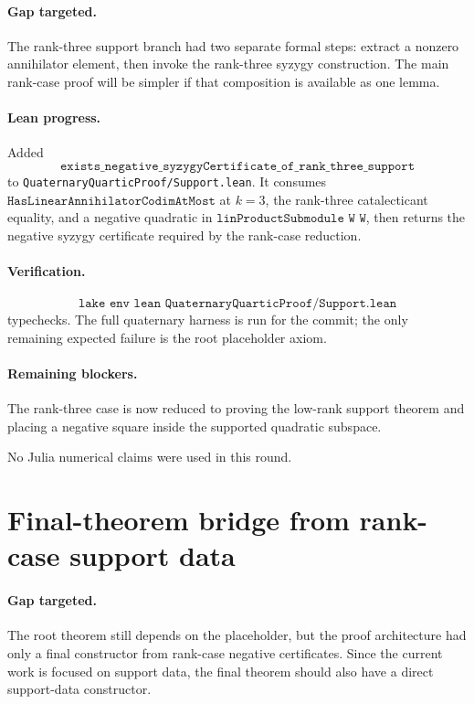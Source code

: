 \documentclass[11pt]{article}
\begin{document}
\paragraph{Gap targeted.}
The rank-three support branch had two separate formal steps: extract a nonzero
annihilator element, then invoke the rank-three syzygy construction.  The main
rank-case proof will be simpler if that composition is available as one lemma.

\paragraph{Lean progress.}
Added
\[
\texttt{exists\_negative\_syzygyCertificate\_of\_rank\_three\_support}
\]
to \texttt{QuaternaryQuarticProof/Support.lean}.  It consumes
\(\texttt{HasLinearAnnihilatorCodimAtMost}\) at \(k=3\), the rank-three
catalecticant equality, and a negative quadratic in
\(\texttt{linProductSubmodule W W}\), then returns the negative syzygy
certificate required by the rank-case reduction.

\paragraph{Verification.}
\[
\texttt{lake env lean QuaternaryQuarticProof/Support.lean}
\]
typechecks.  The full quaternary harness is run for the commit; the only
remaining expected failure is the root placeholder axiom.

\paragraph{Remaining blockers.}
The rank-three case is now reduced to proving the low-rank support theorem and
placing a negative square inside the supported quadratic subspace.

No Julia numerical claims were used in this round.

\section*{Final-theorem bridge from rank-case support data}

\paragraph{Gap targeted.}
The root theorem still depends on the placeholder, but the proof architecture
had only a final constructor from rank-case negative certificates.  Since the
current work is focused on support data, the final theorem should also have a
direct support-data constructor.
\end{document}
